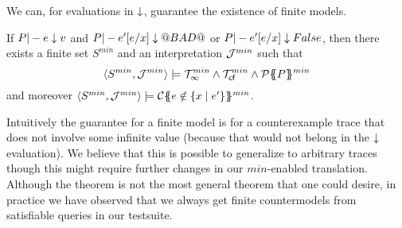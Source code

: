 We can, for evaluations in $\downarrow$, guarantee the existence of finite models. 
\begin{theorem}\label{thm:finite-model} If $P |- e \downarrow v$ and 
$P |- e'[e/x] \downarrow @BAD@$ or $P |- e'[e/x] \downarrow False$, then 
there exists a finite set $S^{min}$ and an interpretation ${{\cal J}}^{min}$ such that 
\[ \langle S^{min},{{\cal J}}^{min}\rangle \models {\cal T}_{\infty}^{min} \land {\cal T}_{\textsf{cf}}^{min} \land {\cal P}\{\!\!\{P\}\!\!\}^{min} \]
and moreover $\langle S^{min},{{\cal J}}^{min}\rangle \models {\cal C}\{\!\!\{e \notin \{ x \mid e' \}\}\!\!\}^{min}$.
\end{theorem}
Intuitively the guarantee for a finite model is for a counterexample trace that does not involve some
infinite value (because that would not belong in the $\downarrow$ evaluation). We believe that this 
is possible to generalize to arbitrary traces though this might require further changes in our 
$min$-enabled translation. Although the theorem is not the most general theorem that one could desire, 
in practice we have observed that we always get finite countermodels from satisfiable queries in 
our testsuite.



